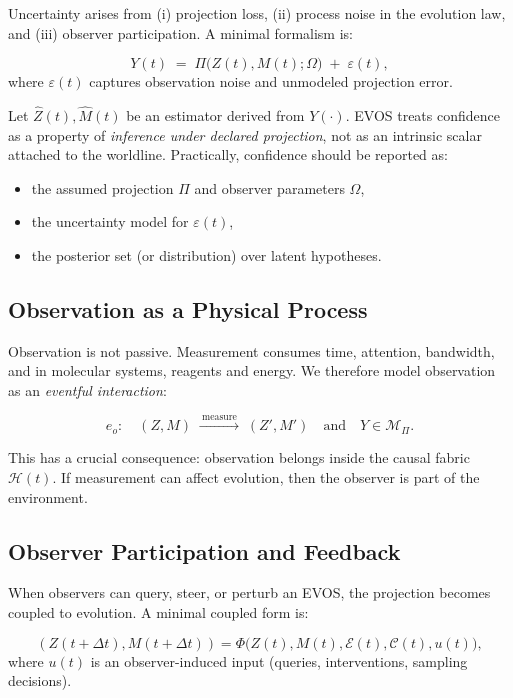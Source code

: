 \documentclass[11pt]{article}
\begin{document}
Uncertainty arises from (i) projection loss, (ii) process noise in the evolution law, and (iii) observer
participation. A minimal formalism is:

\[
Y(t) \;=\; \Pi\big(Z(t),M(t);\Omega\big) \;+\; \varepsilon(t),
\]
where $\varepsilon(t)$ captures observation noise and unmodeled projection error.

Let $\widehat{Z}(t),\widehat{M}(t)$ be an estimator derived from $Y(\cdot)$. EVOS treats confidence as
a property of \emph{inference under declared projection}, not as an intrinsic scalar attached to the
worldline. Practically, confidence should be reported as:

\begin{itemize}
  \item the assumed projection $\Pi$ and observer parameters $\Omega$,
  \item the uncertainty model for $\varepsilon(t)$,
  \item the posterior set (or distribution) over latent hypotheses.
\end{itemize}

\subsection{Observation as a Physical Process}
\label{sec:observation-physical}

Observation is not passive. Measurement consumes time, attention, bandwidth, and in molecular systems,
reagents and energy. We therefore model observation as an \emph{eventful interaction}:

\[
e_o :\quad (Z,M) \;\xrightarrow{\ \text{measure}\ }\; (Z',M') \quad\text{and}\quad Y \in \mathcal{M}_{\Pi}.
\]

This has a crucial consequence: observation belongs inside the causal fabric $\mathcal{H}(t)$.
If measurement can affect evolution, then the observer is part of the environment.

\subsection{Observer Participation and Feedback}
\label{sec:observer-feedback}

When observers can query, steer, or perturb an EVOS, the projection becomes coupled to evolution.
A minimal coupled form is:

\[
(Z(t+\Delta t),M(t+\Delta t)) = \Phi\big(Z(t),M(t),\mathcal{E}(t),\mathcal{C}(t), u(t)\big),
\]
where $u(t)$ is an observer-induced input (queries, interventions, sampling decisions).
\end{document}

